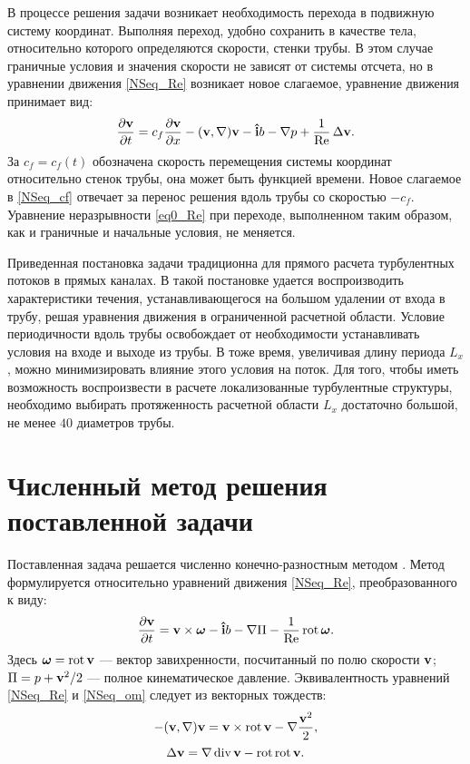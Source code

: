 В процессе решения задачи возникает необходимость перехода в подвижную систему координат. Выполняя переход, удобно сохранить в качестве тела, относительно которого определяются скорости, стенки трубы. В этом случае граничные условия и значения скорости не зависят от системы отсчета, но в уравнении движения \eqref{NSeq_Re} возникает новое слагаемое, уравнение движения принимает вид:
\begin{equation}\label{NSeq_cf}
\frac{\partial \mathbf{v}}{\partial t} = c_f \frac{\partial \mathbf{v}}{\partial x} - (\mathbf{v}, \nabla) \mathbf{v} - \mathbf{\hat{i}} b - \nabla p + \frac{1}{\operatorname{Re}} \mathop{}\!\Delta \mathbf{v}. 
\end{equation}
За $c_f = c_f(t)$ обозначена скорость перемещения системы координат относительно стенок трубы, она может быть функцией времени. Новое слагаемое в \eqref{NSeq_cf} отвечает за перенос решения вдоль трубы со скоростью $-c_f$. Уравнение неразрывности \eqref{eq0_Re} при переходе, выполненном таким образом, как и граничные и начальные условия, не меняется. 

Приведенная постановка задачи традиционна для прямого расчета турбулентных потоков в прямых каналах. В такой постановке удается воспроизводить характеристики течения, устанавливающегося на большом удалении от входа в трубу, решая уравнения движения в ограниченной расчетной области. Условие периодичности вдоль трубы освобождает от необходимости устанавливать условия на входе и выходе из трубы. В тоже время, увеличивая длину периода $L_x$, можно минимизировать влияние этого условия на поток. Для того, чтобы иметь возможность воспроизвести в расчете локализованные турбулентные структуры, необходимо выбирать протяженность расчетной области $L_x$ достаточно большой, не менее $40$ диаметров трубы. 


\section{Численный метод решения поставленной задачи} \label{num_method}

Поставленная задача решается численно конечно-разностным методом \cite{Nikitin2006}. Метод формулируется относительно уравнений движения \eqref{NSeq_Re}, преобразованного к виду:
\begin{equation}\label{NSeq_om}
\frac{\partial \mathbf{v}}{\partial t} =  \mathbf{v} \times \mbox{\boldmath$\omega$}  - \mathbf{\hat{i}} b - \nabla \Pi - \frac{1}{\operatorname{Re}} \mathop{}\!\operatorname{rot} \mbox{\boldmath$\omega$}.
\end{equation}
Здесь $\mbox{\boldmath$\omega$} = \mathop{}\!\operatorname{rot} \mathbf{v}$ --- вектор завихренности, посчитанный по полю скорости $\mathbf{v}$; $\Pi = p + \mathbf{v}^2/2$ --- полное кинематическое давление. Эквивалентность уравнений \eqref{NSeq_Re} и \eqref{NSeq_om} следует из векторных тождеств:
\begin{equation*}
-(\mathbf{v}, \nabla) \mathbf{v} = \mathbf{v} \times \mathop{}\!\operatorname{rot} \mathbf{v} - \nabla \frac{\mathbf{v}^2}{2},
\end{equation*}
\begin{equation*}
\mathop{}\!\Delta \mathbf{v} = \nabla \mathop{}\!\operatorname{div} \mathbf{v} - \mathop{}\!\operatorname{rot} \mathop{}\!\operatorname{rot} \mathbf{v}.
\end{equation*}

